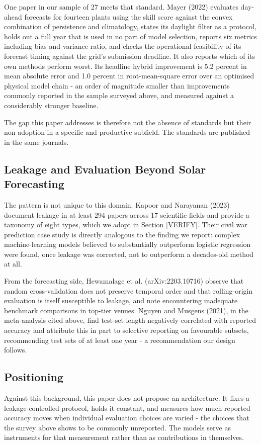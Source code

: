 One paper in our sample of 27 meets that standard. Mayer (2022) evaluates
day-ahead forecasts for fourteen plants using the skill score against the
convex combination of persistence and climatology, states its daylight
filter as a protocol, holds out a full year that is used in no part of
model selection, reports six metrics including bias and variance ratio,
and checks the operational feasibility of its forecast timing against the
grid's submission deadline. It also reports which of its own methods
perform worst. Its headline hybrid improvement is 5.2 percent in mean
absolute error and 1.0 percent in root-mean-square error over an
optimised physical model chain - an order of magnitude smaller than
improvements commonly reported in the sample surveyed above, and measured
against a considerably stronger baseline.

The gap this paper addresses is therefore not the absence of standards
but their non-adoption in a specific and productive subfield. The
standards are published in the same journals.

\subsection{Leakage and Evaluation Beyond Solar Forecasting}

The pattern is not unique to this domain. Kapoor and Narayanan (2023)
document leakage in at least 294 papers across 17 scientific fields and
provide a taxonomy of eight types, which we adopt in Section [VERIFY].
Their civil war prediction case study is directly analogous to the
finding we report: complex machine-learning models believed to
substantially outperform logistic regression were found, once leakage was
corrected, not to outperform a decades-old method at all.

From the forecasting side, Hewamalage et al. (arXiv:2203.10716) observe that random
cross-validation does not preserve temporal order and that rolling-origin
evaluation is itself susceptible to leakage, and note encountering
inadequate benchmark comparisons in top-tier venues. Nguyen and Musgens
(2021), in the meta-analysis cited above, find test-set length negatively
correlated with reported accuracy and attribute this in part to selective
reporting on favourable subsets, recommending test sets of at least one
year - a recommendation our design follows.

\subsection{Positioning}

Against this background, this paper does not propose an architecture.
It fixes a leakage-controlled protocol, holds it constant, and measures
how much reported accuracy moves when individual evaluation choices are
varied - the choices that the survey above shows to be commonly
unreported. The models serve as instruments for that measurement rather
than as contributions in themselves.

